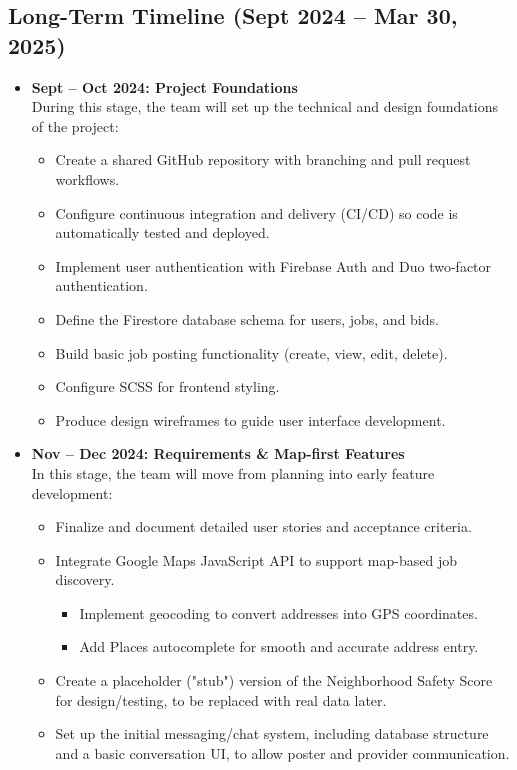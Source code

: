 \documentclass[11pt]{article}
\begin{document}
\subsection*{Long-Term Timeline (Sept 2024 -- Mar 30, 2025)}
\begin{itemize}[leftmargin=1.4em]
  \item \textbf{Sept -- Oct 2024: Project Foundations} \\
  During this stage, the team will set up the technical and design foundations of the project:
  \begin{itemize}
    \item Create a shared GitHub repository with branching and pull request workflows.
    \item Configure continuous integration and delivery (CI/CD) so code is automatically tested and deployed.
    \item Implement user authentication with Firebase Auth and Duo two-factor authentication.
    \item Define the Firestore database schema for users, jobs, and bids.
    \item Build basic job posting functionality (create, view, edit, delete).
    \item Configure SCSS for frontend styling.
    \item Produce design wireframes to guide user interface development.
  \end{itemize}
  \item \textbf{Nov -- Dec 2024: Requirements \& Map-first Features} \\
  In this stage, the team will move from planning into early feature development:
  \begin{itemize}
    \item Finalize and document detailed user stories and acceptance criteria.
    \item Integrate Google Maps JavaScript API to support map-based job discovery.
      \begin{itemize}
        \item Implement geocoding to convert addresses into GPS coordinates.
        \item Add Places autocomplete for smooth and accurate address entry.
      \end{itemize}
    \item Create a placeholder ("stub") version of the Neighborhood Safety Score for design/testing, to be replaced with real data later.
    \item Set up the initial messaging/chat system, including database structure and a basic conversation UI, to allow poster and provider communication.

\end{itemize}
\end{itemize}
\end{document}
